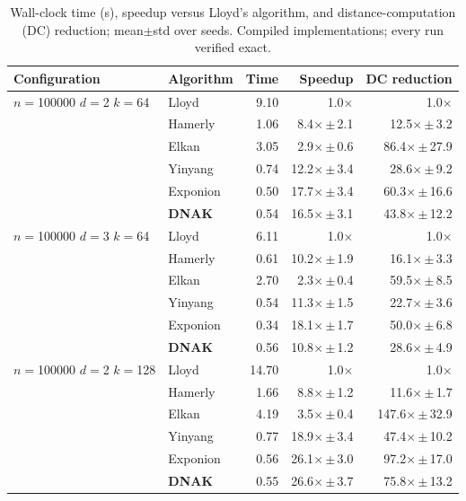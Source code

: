 \documentclass[review,12pt]{elsarticle}
\begin{document}
\begin{table}[t]
\centering
\caption{Wall-clock time (s), speedup versus Lloyd's algorithm, and
distance-computation (DC) reduction; mean$\pm$std over seeds. Compiled
implementations; every run verified exact.}
\label{tab:main}
\scriptsize
\setlength{\tabcolsep}{3.2pt}
\begin{tabular}{llrrr}
\toprule
Configuration & Algorithm & Time & Speedup & DC reduction \\
\midrule
$n{=}$100000 $d{=}$2 $k{=}$64 & Lloyd & 9.10 & 1.0$\times$ & 1.0$\times$ \\
 & Hamerly & 1.06 & 8.4$\times$\,$\pm$\,2.1 & 12.5$\times$\,$\pm$\,3.2 \\
 & Elkan & 3.05 & 2.9$\times$\,$\pm$\,0.6 & 86.4$\times$\,$\pm$\,27.9 \\
 & Yinyang & 0.74 & 12.2$\times$\,$\pm$\,3.4 & 28.6$\times$\,$\pm$\,9.2 \\
 & Exponion & 0.50 & 17.7$\times$\,$\pm$\,3.4 & 60.3$\times$\,$\pm$\,16.6 \\
 & \textbf{DNAK} & 0.54 & 16.5$\times$\,$\pm$\,3.1 & 43.8$\times$\,$\pm$\,12.2 \\
\midrule
$n{=}$100000 $d{=}$3 $k{=}$64 & Lloyd & 6.11 & 1.0$\times$ & 1.0$\times$ \\
 & Hamerly & 0.61 & 10.2$\times$\,$\pm$\,1.9 & 16.1$\times$\,$\pm$\,3.3 \\
 & Elkan & 2.70 & 2.3$\times$\,$\pm$\,0.4 & 59.5$\times$\,$\pm$\,8.5 \\
 & Yinyang & 0.54 & 11.3$\times$\,$\pm$\,1.5 & 22.7$\times$\,$\pm$\,3.6 \\
 & Exponion & 0.34 & 18.1$\times$\,$\pm$\,1.7 & 50.0$\times$\,$\pm$\,6.8 \\
 & \textbf{DNAK} & 0.56 & 10.8$\times$\,$\pm$\,1.2 & 28.6$\times$\,$\pm$\,4.9 \\
\midrule
$n{=}$100000 $d{=}$2 $k{=}$128 & Lloyd & 14.70 & 1.0$\times$ & 1.0$\times$ \\
 & Hamerly & 1.66 & 8.8$\times$\,$\pm$\,1.2 & 11.6$\times$\,$\pm$\,1.7 \\
 & Elkan & 4.19 & 3.5$\times$\,$\pm$\,0.4 & 147.6$\times$\,$\pm$\,32.9 \\
 & Yinyang & 0.77 & 18.9$\times$\,$\pm$\,3.4 & 47.4$\times$\,$\pm$\,10.2 \\
 & Exponion & 0.56 & 26.1$\times$\,$\pm$\,3.0 & 97.2$\times$\,$\pm$\,17.0 \\
 & \textbf{DNAK} & 0.55 & 26.6$\times$\,$\pm$\,3.7 & 75.8$\times$\,$\pm$\,13.2 \\

\end{tabular}
\end{table}
\end{document}
